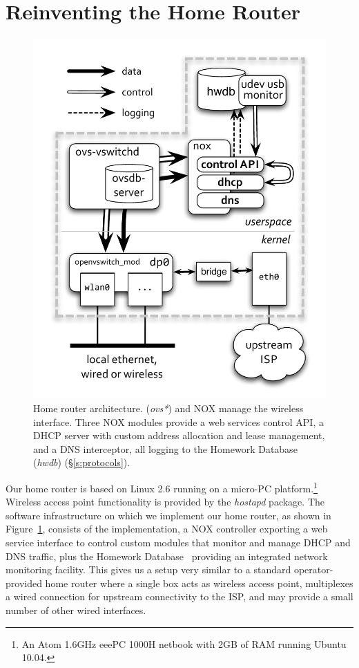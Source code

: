 
\section{Reinventing the Home Router} \label{s:router}
 
\begin{figure} 
  \centering 
  \includegraphics[trim=0.5cm 1cm 0.5cm 2.5cm, width=0.5\columnwidth]{architecture}
  \caption{\label{f:architecture}Home router architecture.  \ovs
    (\emph{ovs*}) and NOX manage the wireless interface.  Three NOX modules
    provide a web services control API, a DHCP server with custom address
    allocation and lease management, and a DNS interceptor, all logging to the
    Homework Database (\emph{hwdb}) (\S\ref{s:protocols}). 
}\end{figure}

Our home router is based on Linux 2.6 running on a micro-PC
platform.\footnote{An Atom 1.6GHz eeePC 1000H netbook with 2GB of RAM running
  Ubuntu 10.04.} Wireless access point functionality is provided by the
\emph{hostapd} package.  The software infrastructure on which we implement our
home router, as shown in Figure~\ref{f:architecture}, consists of the \ovs \of
implementation, a NOX controller exporting a web service interface to control
custom modules that monitor and manage DHCP and DNS traffic, plus the Homework
Database~\cite{sventek11:_infor_plane_archit_suppor_home_networ_manag} providing
an integrated network monitoring facility.  This gives us a setup very similar
to a standard operator-provided home router where a single box acts as wireless
access point, multiplexes a wired connection for upstream connectivity to the
ISP, and may provide a small number of other wired interfaces. 
                                                                    
